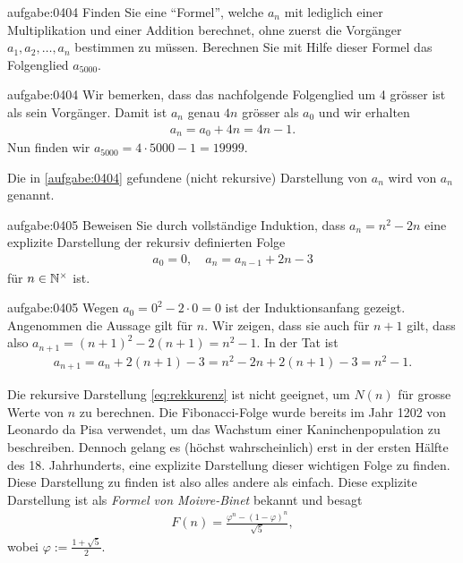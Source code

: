 \begin{aufgabe}{aufgabe:0404}
Finden Sie eine \enquote{Formel}, welche $a_n$ mit lediglich einer Multiplikation und einer Addition berechnet, ohne zuerst die Vorgänger $a_{1}, a_{2}, \ldots, a_{n}$ bestimmen zu müssen. Berechnen Sie mit Hilfe dieser Formel das Folgenglied $a_{5000}$.
\end{aufgabe}
\begin{antwort}{aufgabe:0404}
Wir bemerken, dass das nachfolgende Folgenglied um 4 grösser ist als sein Vorgänger. Damit ist $a_n$ genau $4n$ grösser als $a_0$ und wir erhalten
\begin{align*}
    a_n = a_0 + 4n = 4n - 1.
\end{align*}
Nun finden wir $a_{5000} = 4\cdot 5000 - 1 = 19999$.
\end{antwort}
Die in \cref{aufgabe:0404} gefundene (nicht rekursive) Darstellung von $a_n$ wird  von $a_n$ genannt.

\begin{aufgabe}{aufgabe:0405}
Beweisen Sie durch vollständige Induktion, dass $a_n = n^2 -2n$ eine explizite Darstellung der rekursiv definierten Folge
\begin{align*}
    a_0 = 0, \quad a_{n} = a_{n-1} + 2n - 3
\end{align*}
für $n\in\mathbb{N}^{\times}$ ist.
\end{aufgabe}
\begin{antwort}{aufgabe:0405}
Wegen $a_0 = 0^2 - 2\cdot 0 = 0$ ist der Induktionsanfang gezeigt. Angenommen die Aussage gilt für $n$. Wir zeigen, dass sie auch für $n+1$ gilt, dass also $a_{n+1} = (n+1)^2 - 2(n+1) = n^2 - 1$. In der Tat ist
\begin{align*}
    a_{n+1} = a_n + 2(n+1) - 3 = n^2 - 2n + 2(n+1) - 3 = n^2 - 1.
\end{align*}
\end{antwort}
Die rekursive Darstellung \cref{eq:rekkurenz} ist nicht geeignet, um $N(n)$ für grosse Werte von $n$ zu berechnen. Die Fibonacci-Folge wurde bereits im  Jahr 1202 von Leonardo da Pisa verwendet, um das Wachstum einer Kaninchenpopulation zu beschreiben. Dennoch gelang es (höchst wahrscheinlich) erst in der ersten Hälfte des 18. Jahrhunderts, eine explizite Darstellung dieser wichtigen Folge zu finden. Diese Darstellung zu finden ist also alles andere als einfach. Diese explizite Darstellung ist als \textit{Formel von Moivre-Binet} bekannt und besagt
\begin{align}\label{eq:binet}
    F(n) = \frac{\varphi^n - (1-\varphi)^n}{\sqrt{5}},
\end{align}
wobei $\varphi := \frac{1+\sqrt{5}}{2}$.

